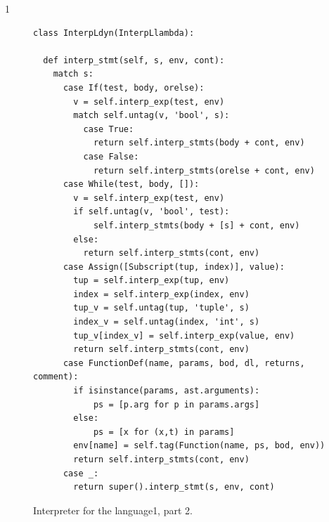 \documentclass[7x10]{TimesAPriori_MIT}%
\def\pythonEd{1}
\def\edition{1}
\newcommand{\pythonColor}[0]{}
\newcommand{\python}[1]{{\if\edition\pythonEd\pythonColor #1\fi}}
\numberwithin{theorem}{chapter}
\numberwithin{definition}{chapter}
\numberwithin{equation}{chapter}
\begin{document}
{\if\edition\pythonEd\pythonColor
  \begin{figure}[tbp]
\begin{tcolorbox}[colback=white]    
\begin{lstlisting}[basicstyle=\ttfamily\footnotesize]
class InterpLdyn(InterpLlambda):
  
  def interp_stmt(self, s, env, cont):
    match s:
      case If(test, body, orelse):
        v = self.interp_exp(test, env)
        match self.untag(v, 'bool', s):
          case True:
            return self.interp_stmts(body + cont, env)
          case False:
            return self.interp_stmts(orelse + cont, env)
      case While(test, body, []):
        v = self.interp_exp(test, env)
        if self.untag(v, 'bool', test):
            self.interp_stmts(body + [s] + cont, env)
        else:
          return self.interp_stmts(cont, env)
      case Assign([Subscript(tup, index)], value):
        tup = self.interp_exp(tup, env)
        index = self.interp_exp(index, env)
        tup_v = self.untag(tup, 'tuple', s)
        index_v = self.untag(index, 'int', s)
        tup_v[index_v] = self.interp_exp(value, env)
        return self.interp_stmts(cont, env)
      case FunctionDef(name, params, bod, dl, returns, comment):
        if isinstance(params, ast.arguments):
            ps = [p.arg for p in params.args]
        else:
            ps = [x for (x,t) in params]
        env[name] = self.tag(Function(name, ps, bod, env))
        return self.interp_stmts(cont, env)
      case _:
        return super().interp_stmt(s, env, cont)
\end{lstlisting}
\end{tcolorbox}

\caption{Interpreter for the \LangDyn{} language\python{, part 2}.}
\label{fig:interp-Ldyn-2}
\end{figure}
\fi}
\end{document}

